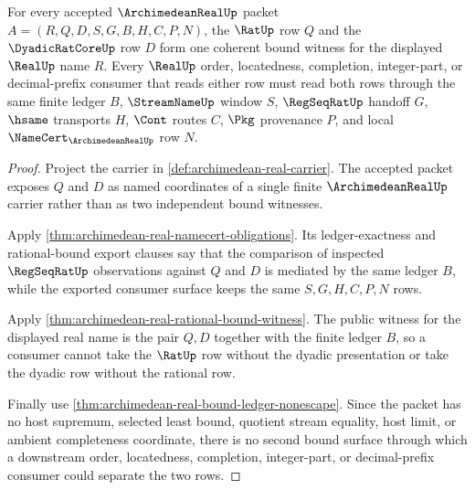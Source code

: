 \begin{theorem}
\label{thm:archimedean-real-rat-dyadic-bound-coherence}
For every accepted $\ArchimedeanRealUp$ packet $A=(R,Q,D,S,G,B,H,C,P,N)$, the $\RatUp$ row $Q$ and the $\DyadicRatCoreUp$ row $D$ form one coherent bound witness for the displayed $\RealUp$ name $R$. Every $\RealUp$ order, locatedness, completion, integer-part, or decimal-prefix consumer that reads either row must read both rows through the same finite ledger $B$, $\StreamNameUp$ window $S$, $\RegSeqRatUp$ handoff $G$, $\hsame$ transports $H$, $\Cont$ routes $C$, $\Pkg$ provenance $P$, and local $\NameCert_{\ArchimedeanRealUp}$ row $N$.
\end{theorem}
\begin{proof}
Project the carrier in \autoref{def:archimedean-real-carrier}. The accepted packet exposes $Q$ and $D$ as named coordinates of a single finite $\ArchimedeanRealUp$ carrier rather than as two independent bound witnesses.

Apply \autoref{thm:archimedean-real-namecert-obligations}. Its ledger-exactness and rational-bound export clauses say that the comparison of inspected $\RegSeqRatUp$ observations against $Q$ and $D$ is mediated by the same ledger $B$, while the exported consumer surface keeps the same $S,G,H,C,P,N$ rows.

Apply \autoref{thm:archimedean-real-rational-bound-witness}. The public witness for the displayed real name is the pair $Q,D$ together with the finite ledger $B$, so a consumer cannot take the $\RatUp$ row without the dyadic presentation or take the dyadic row without the rational row.

Finally use \autoref{thm:archimedean-real-bound-ledger-nonescape}. Since the packet has no host supremum, selected least bound, quotient stream equality, host limit, or ambient completeness coordinate, there is no second bound surface through which a downstream order, locatedness, completion, integer-part, or decimal-prefix consumer could separate the two rows.
\end{proof}

